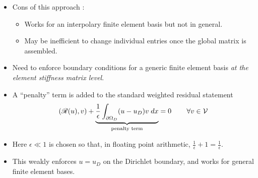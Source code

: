 \begin{frame}[c]
\begin{block}{}
  \begin{itemize}[<+->]
    \item {Cons of this approach :
      \begin{itemize}[<+->]
      \item {Works for an interpolary finite element basis
	but not in general.}
	
      \item {May be inefficient to change individual entries once the global matrix is assembled.}
      \end{itemize}
      }
    \item {Need to enforce boundary conditions for
      a generic finite element basis \emph{at the element stiffness matrix level}.}

  \end{itemize}
  \end{block}
\end{frame}



\begin{frame}[c]
\begin{block}{}
  \begin{itemize}[<+->]
  \item A ``penalty'' term is added to the standard weighted residual statement
    \begin{equation}
      \nonumber
      (\mathscr{R}( u ), v)
      + \underbrace{\frac{1}{\epsilon} \int_{\partial \Omega_D} (u-u_D)v \; dx}_{\text{penalty term}} =
      0 \hspace{.3in} \forall v \in \mathcal{V}
    \end{equation}

  \item Here $\epsilon \ll 1$ is chosen so that, in floating point arithmetic,
    $\frac{1}{\epsilon} + 1 = \frac{1}{\epsilon}$.

  \item This weakly enforces $u=u_D$ on the Dirichlet boundary, and works for
    general finite element bases.

  \end{itemize}
  \end{block}
\end{frame}



